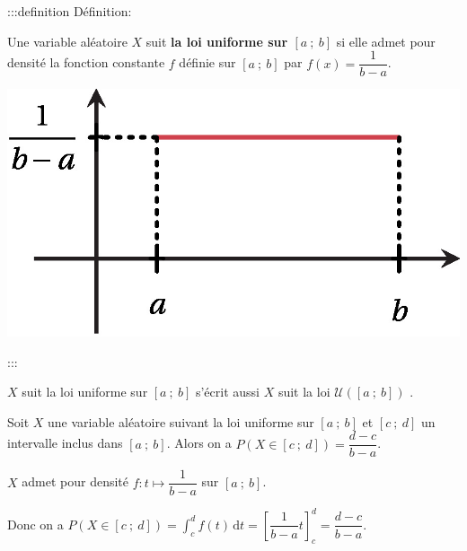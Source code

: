 \documentclass{cornouaille}
\begin{document}
:::definition Définition: 



\begin{minipage}{0.6\linewidth}
Une variable aléatoire $X$ suit \textbf{la loi uniforme sur $\left[a\ ;\ b \right]$} si elle admet pour densité la fonction  constante $f$ définie sur $\left[a\ ;\ b \right]$ par $f(x)=\dfrac{1}{b-a}$.

\end{minipage}

\hfill

\begin{minipage}{0.4\linewidth}




\includegraphics{./TS-Variables-2}



\end{minipage}




:::



\begin{remarque}
\og $X$ suit la loi uniforme sur $\left[a\ ;\ b \right]$ \fg{} s'écrit aussi \og $X$ suit la loi $\mathcal{U}\left(\left[a\ ;\ b \right]\right)$ \fg.
\end{remarque}



\begin{propriete}
Soit $X$ une variable aléatoire suivant la loi uniforme sur $\left[a\ ;\ b \right]$ et $\left[c\ ;\ d \right]$ un intervalle inclus dans $\left[a\ ;\ b \right]$. Alors on a $P\left(X\in\left[c\ ;\ d \right]\right)=\dfrac{d-c}{b-a}$.
\end{propriete}



\begin{preuve}
$X$ admet pour densité $f:t\mapsto \dfrac{1}{b-a}$ sur $\left[a\ ;\ b \right]$.

Donc on a $P\left(X\in\left[c\ ;\ d \right]\right)=\displaystyle \int_{c}^{d} f(t) \, \textrm{d}t=\left[\dfrac{1}{b-a}t\right]_{c}^{d}=\dfrac{d-c}{b-a}$.
\end{preuve}
\end{document}
